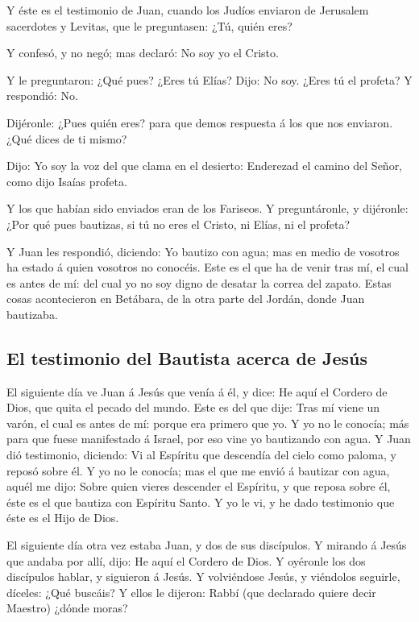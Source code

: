  Y éste es el testimonio de Juan, cuando los Judíos
enviaron de Jerusalem sacerdotes y Levitas, que le preguntasen: ¿Tú,
quién eres?

 Y confesó, y no negó; mas declaró: No soy yo el Cristo.

 Y le preguntaron: ¿Qué pues? ¿Eres tú Elías? Dijo: No
soy. ¿Eres tú el profeta? Y respondió: No.

 Dijéronle: ¿Pues quién eres? para que demos respuesta á
los que nos enviaron. ¿Qué dices de ti mismo?

 Dijo: Yo soy la voz del que clama en el desierto:
Enderezad el camino del Señor, como dijo Isaías profeta.

 Y los que habían sido enviados eran de los Fariseos.
 Y preguntáronle, y dijéronle: ¿Por qué pues bautizas, si
tú no eres el Cristo, ni Elías, ni el profeta?

 Y Juan les respondió, diciendo: Yo bautizo con agua; mas
en medio de vosotros ha estado á quien vosotros no conocéis.
 Este es el que ha de venir tras mí, el cual es antes de
mí: del cual yo no soy digno de desatar la correa del zapato.
 Estas cosas acontecieron en Betábara, de la otra parte
del Jordán, donde Juan bautizaba.

\hypertarget{el-testimonio-del-bautista-acerca-de-jesuxfas}{%
\subsection{El testimonio del Bautista acerca de
Jesús}\label{el-testimonio-del-bautista-acerca-de-jesuxfas}}

 El siguiente día ve Juan á Jesús que venía á él, y dice:
He aquí el Cordero de Dios, que quita el pecado del mundo.
 Este es del que dije: Tras mí viene un varón, el cual es
antes de mí: porque era primero que yo.  Y yo no le
conocía; más para que fuese manifestado á Israel, por eso vine yo
bautizando con agua.  Y Juan dió testimonio, diciendo: Vi
al Espíritu que descendía del cielo como paloma, y reposó sobre él.
 Y yo no le conocía; mas el que me envió á bautizar con
agua, aquél me dijo: Sobre quien vieres descender el Espíritu, y que
reposa sobre él, éste es el que bautiza con Espíritu Santo.
 Y yo le vi, y he dado testimonio que éste es el Hijo de
Dios.

 El siguiente día otra vez estaba Juan, y dos de sus
discípulos.  Y mirando á Jesús que andaba por allí, dijo:
He aquí el Cordero de Dios.  Y oyéronle los dos
discípulos hablar, y siguieron á Jesús.  Y volviéndose
Jesús, y viéndolos seguirle, díceles: ¿Qué buscáis? Y ellos le dijeron:
Rabbí (que declarado quiere decir Maestro) ¿dónde moras?

